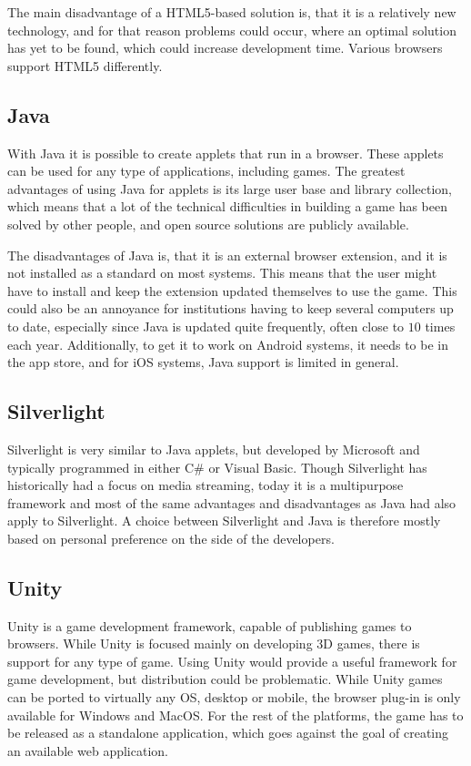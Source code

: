 The main disadvantage of a HTML5-based solution is, that it is a relatively new technology, and for that reason problems could occur, where an optimal solution has yet to be found, which could increase development time.
Various browsers support HTML5 differently.

\subsection{Java}
With Java it is possible to create applets that run in a browser.\cite{java13}
These applets can be used for any type of applications, including games.
The greatest advantages of using Java for applets is its large user base and library collection, which means that a lot of the technical difficulties in building a game has been solved by other people, and open source solutions are publicly available.\newline

The disadvantages of Java is, that it is an external browser extension, and it is not installed as a standard on most systems.
This means that the user might have to install and keep the extension updated themselves to use the game. 
This could also be an annoyance for institutions having to keep several computers up to date, especially since Java is updated quite frequently, often close to $10$ times each year.\cite{javahistory13}
Additionally, to get it to work on Android systems, it needs to be in the app store, and for iOS systems, Java support is limited in general.

\subsection{Silverlight}
Silverlight is very similar to Java applets, but developed by Microsoft and typically programmed in either C\# or Visual Basic.\cite{silverlight13}
Though Silverlight has historically had a focus on media streaming, today it is a multipurpose framework and most of the same advantages and disadvantages as Java had also apply to Silverlight.
A choice between Silverlight and Java is therefore mostly based on personal preference on the side of the developers.

\subsection{Unity}
Unity is a game development framework, capable of publishing games to browsers.\cite{unity13} 
While Unity is focused mainly on developing 3D games, there is support for any type of game.
Using Unity would provide a useful framework for game development, but distribution could be problematic.
While Unity games can be ported to virtually any OS, desktop or mobile, the browser plug-in is only available for Windows and MacOS.
For the rest of the platforms, the game has to be released as a standalone application, which goes against the goal of creating an available web application.


